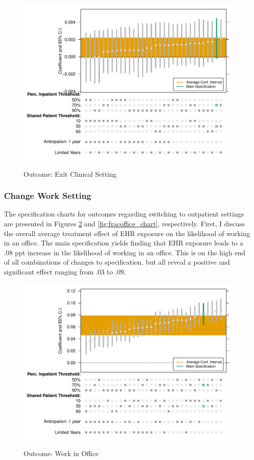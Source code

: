 \documentclass[12pt]{article}
\begin{document}
\begin{figure}[ht]
    \caption{Outcome: Exit Clinical Setting}
    \includegraphics[scale=.7]{Objects/retire_chart.pdf}
    \label{fig:retire_chart}
\end{figure}

\subsubsection{Change Work Setting}

The specification charts for outcomes regarding switching to outpatient settings are presented in Figures \ref{fig:work_chart} and \ref{fig:fracoffice_chart}, respectively. First, I discuss the overall average treatment effect of EHR exposure on the likelihood of working in an office. The main specification yields finding that EHR exposure leads to a .08 ppt increase in the likelihood of working in an office. This is on the high end of all combinations of changes to specification, but all reveal a positive and significant effect ranging from .03 to .09.   

\begin{figure}[ht]
    \caption{Outcome: Work in Office}
    \includegraphics[scale=.7]{Objects/office_ind_chart.pdf}
    \label{fig:work_chart}
\end{figure}
\end{document}
